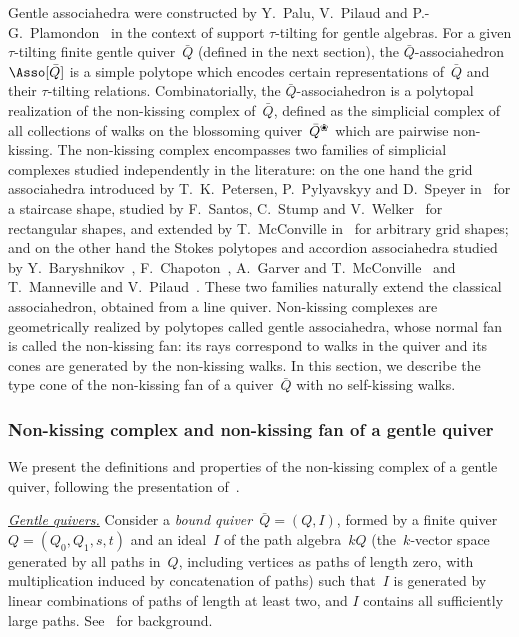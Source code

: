 \documentclass{amsart}
\theoremstyle{definition}
\newcommand{\darkblue}{\color{darkblue}} %
\newcommand{\defn}[1]{\textsl{\darkblue #1}} %
\newcommand{\para}[1]{\medskip\noindent\uline{\textit{#1.}}} %
\newcommand{\quiver}{\bar Q} %
\newcommand{\blossom}{^\text{\ding{96}}} %
\begin{document}
Gentle associahedra were constructed by Y.~Palu, V.~Pilaud and P.-G.~Plamondon~\cite{PaluPilaudPlamondon-nonkissing} in the context of support $\tau$-tilting for gentle algebras.
For a given $\tau$-tilting finite gentle quiver~$\quiver$ (defined in the next section), the $\quiver$-associahedron~$\Asso[\quiver]$ is a simple polytope which encodes certain representations of~$\quiver$ and their $\tau$-tilting relations.
Combinatorially, the $\quiver$-associahedron is a polytopal realization of the non-kissing complex of~$\quiver$, defined as the simplicial complex of all collections of walks on the blossoming quiver~$\quiver\blossom$ which are pairwise non-kissing.
The non-kissing complex encompasses two families of simplicial complexes studied independently in the literature: on the one hand the grid associahedra introduced by T.~K.~Petersen, P.~Pylyavskyy and D.~Speyer in~\cite{PetersenPylyavskyySpeyer} for a staircase shape, studied by F.~Santos, C.~Stump and V.~Welker~\cite{SantosStumpWelker} for rectangular shapes, and extended by T.~McConville in~\cite{McConville} for arbitrary grid shapes; and on the other hand the Stokes polytopes and accordion associahedra studied by Y.~Baryshnikov~\cite{Baryshnikov}, F.~Chapoton~\cite{Chapoton-quadrangulations}, A.~Garver and T.~McConville~\cite{GarverMcConville} and T.~Manneville and V.~Pilaud~\cite{MannevillePilaud-accordion}.
These two families naturally extend the classical associahedron, obtained from a line quiver.
Non-kissing complexes are geometrically realized by polytopes called gentle associahedra, whose normal fan is called the non-kissing fan: its rays correspond to walks in the quiver and its cones are generated by the non-kissing walks.
In this section, we describe the type cone of the non-kissing fan of a quiver~$\quiver$ with no self-kissing walks.

\subsubsection{Non-kissing complex and non-kissing fan of a gentle quiver}

We present the definitions and properties of the non-kissing complex of a gentle quiver, following the presentation of~\cite{PaluPilaudPlamondon-nonkissing}.

\para{Gentle quivers}
%
Consider a \defn{bound quiver}~${\quiver = (Q,I)}$, formed by a finite quiver~$Q = (Q_0, Q_1, s, t)$ and an ideal~$I$ of the path algebra~$kQ$ (the~$k$-vector space generated by all paths in~$Q$, including vertices as paths of length zero, with multiplication induced by concatenation of paths) such that~$I$ is generated by linear combinations of paths of length at least two, and $I$ contains all sufficiently large paths. See~\cite{AssemSimsonSkowronski} for background.
\end{document}

